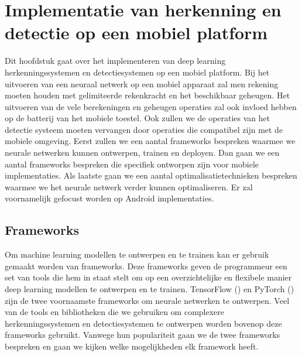 \chapter{Implementatie van herkenning en detectie op een mobiel platform}
Dit hoofdstuk gaat over het implementeren van deep learning herkenningssystemen en detectiesystemen op een mobiel platform.
Bij het uitvoeren van een neuraal netwerk op een mobiel apparaat zal men rekening moeten houden met gelimiteerde rekenkracht en het beschikbaar geheugen.
Het uitvoeren van de vele berekeningen en geheugen operaties zal ook invloed hebben op de batterij van het mobiele toestel.
Ook zullen we de operaties van het detectie systeem moeten vervangen door operaties die compatibel zijn met de mobiele omgeving.
Eerst zullen we een aantal frameworks bespreken waarmee we neurale netwerken kunnen ontwerpen, trainen en deployen.
Dan gaan we een aantal frameworks bespreken die specifiek ontworpen zijn voor mobiele implementaties.
Als laatste gaan we een aantal optimalisatietechnieken bespreken waarmee we het neurale netwerk verder kunnen optimaliseren.
Er zal voornamelijk gefocust worden op Android implementaties.

\section{Frameworks}
Om machine learning modellen te ontwerpen en te trainen kan er gebruik gemaakt worden van frameworks.
Deze frameworks geven de programmeur een set van tools die hem in staat stelt om op een overzichtelijke en flexibele manier deep learning modellen te ontwerpen en te trainen.
TensorFlow (\cite{abadi_tensorflow_2016}) en PyTorch (\cite{li_PyTorch_2020}) zijn de twee voornaamste frameworks om neurale netwerken te ontwerpen.
Veel van de tools en bibliotheken die we gebruiken om complexere herkenningssystemen en detectiesystemen te ontwerpen worden bovenop deze frameworks gebruikt.
Vanwege hun populariteit gaan we de twee frameworks bespreken en gaan we kijken welke mogelijkheden elk framework heeft.

